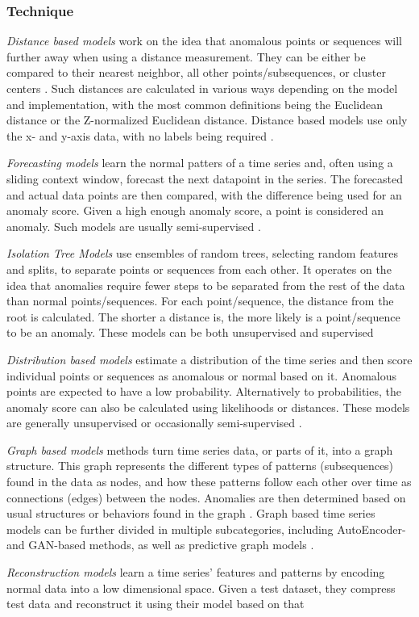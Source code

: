 \documentclass[12pt,oneside]{article}
\begin{document}
\subsubsection{Technique} \textit{Distance based models} work on the idea that anomalous points or sequences will further away when using a distance measurement. They can be either be compared to their nearest neighbor, all other points/subsequences, or cluster centers \parencites[p.~6]{SchmidlEtAl2022Anomaly}. Such distances are calculated in various ways depending on the model and implementation, with the most common definitions being the Euclidean distance or the Z-normalized Euclidean distance. Distance based models use only the x- and y-axis data, with no labels being required \parencites[p.~8]{boniol2024divetimeseriesanomalydetection}. \par \textit{Forecasting models} learn the normal patters of a time series and, often using a sliding context window, forecast the next datapoint in the series. The forecasted and actual data points are then compared, with the difference being used for an anomaly score. Given a high enough anomaly score, a point is considered an anomaly. Such models are usually semi-supervised \parencites[p.~4-5]{SchmidlEtAl2022Anomaly}. \par \textit{Isolation Tree Models} use ensembles of random trees, selecting random features and splits, to separate points or sequences from each other. It operates on the idea that anomalies require fewer steps to be separated from the rest of the data than normal points/sequences. For each point/sequence, the distance from the root is calculated. The shorter a distance is, the more likely is a point/sequence to be an anomaly. These models can be both unsupervised and supervised \parencites[p.~6-7]{SchmidlEtAl2022Anomaly} \par \textit{Distribution based models} estimate a distribution of the time series and then score individual points or sequences as anomalous or normal based on it. Anomalous points are expected to have a low probability. Alternatively to probabilities, the anomaly score can also be calculated using likelihoods or distances. These models are generally unsupervised or occasionally semi-supervised \parencites[p.~6]{SchmidlEtAl2022Anomaly}. \par \textit{Graph based models} methods turn time series data, or parts of it, into a graph structure. This graph represents the different types of patterns (subsequences) found in the data as nodes, and how these patterns follow each other over time as connections (edges) between the nodes. Anomalies are then determined based on usual structures or behaviors found in the graph \parencites[p.~23-24]{boniol2024divetimeseriesanomalydetection}. Graph based time series models can be further divided in multiple subcategories, including AutoEncoder- and GAN-based methods, as well as predictive graph models \parencite{ho2025graphanomalydetectiontime}. \par \textit{Reconstruction models} learn a time series' features and patterns by encoding normal data into a low dimensional space. Given a test dataset, they compress test data and reconstruct it using their model based on that 
\end{document}
